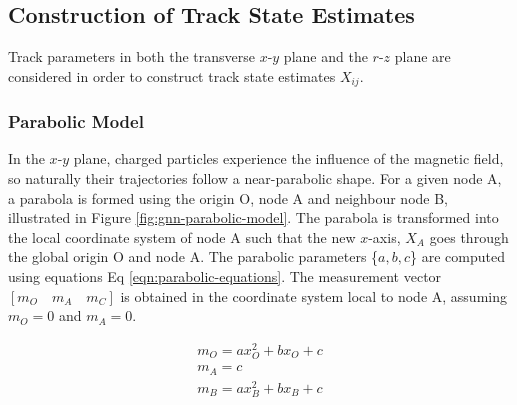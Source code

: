 




\subsection{Construction of Track State Estimates}
\label{constructing-track-states}

Track parameters in both the transverse $x$-$y$ plane and the $r$-$z$ plane are considered in order to construct track state estimates $X_{ij}$.


\subsubsection{Parabolic Model}
\label{parabolic-state}

In the $x$-$y$ plane, charged particles experience the influence of the magnetic field, so naturally their trajectories follow a near-parabolic shape. For a given node A, a parabola is formed using the origin O, node A and neighbour node B, illustrated in Figure \ref{fig:gnn-parabolic-model}. The parabola is transformed into the local coordinate system of node A such that the new $x$-axis, $X_A$ goes through the global origin O and node A. The parabolic parameters \{$a, b, c$\} are computed using equations Eq \eqref{eqn:parabolic-equations}. The measurement vector $[m_O \quad m_A \quad m_C]$ is obtained in the coordinate system local to node A, assuming $m_O = 0$ and $m_A = 0$.

\begin{equation}
\begin{aligned}
m_O = ax_{O}^{2} + bx_O + c \\
m_A = c \\
m_B = ax_{B}^{2} + bx_B + c
\end{aligned}
\label{eqn:parabolic-equations}
\end{equation}

